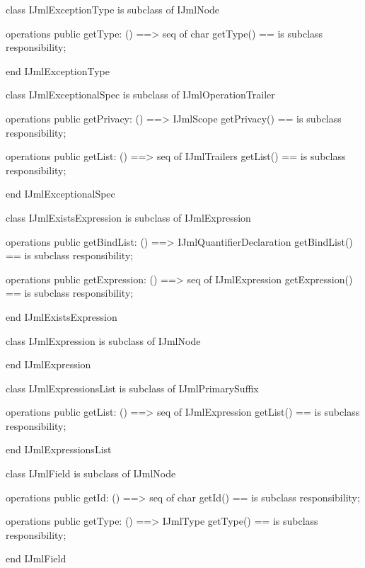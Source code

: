 \begin{vdm_al}
class IJmlExceptionType
 is subclass of IJmlNode

operations
  public getType: () ==> seq of char
  getType() == is subclass responsibility;

end IJmlExceptionType
\end{vdm_al}

\begin{vdm_al}
class IJmlExceptionalSpec
 is subclass of IJmlOperationTrailer

operations
  public getPrivacy: () ==> IJmlScope
  getPrivacy() == is subclass responsibility;

operations
  public getList: () ==> seq of IJmlTrailers
  getList() == is subclass responsibility;

end IJmlExceptionalSpec
\end{vdm_al}

\begin{vdm_al}
class IJmlExistsExpression
 is subclass of IJmlExpression

operations
  public getBindList: () ==> IJmlQuantifierDeclaration
  getBindList() == is subclass responsibility;

operations
  public getExpression: () ==> seq of IJmlExpression
  getExpression() == is subclass responsibility;

end IJmlExistsExpression
\end{vdm_al}

\begin{vdm_al}
class IJmlExpression
 is subclass of IJmlNode

end IJmlExpression
\end{vdm_al}

\begin{vdm_al}
class IJmlExpressionsList
 is subclass of IJmlPrimarySuffix

operations
  public getList: () ==> seq of IJmlExpression
  getList() == is subclass responsibility;

end IJmlExpressionsList
\end{vdm_al}

\begin{vdm_al}
class IJmlField
 is subclass of IJmlNode

operations
  public getId: () ==> seq of char
  getId() == is subclass responsibility;

operations
  public getType: () ==> IJmlType
  getType() == is subclass responsibility;

end IJmlField
\end{vdm_al}

